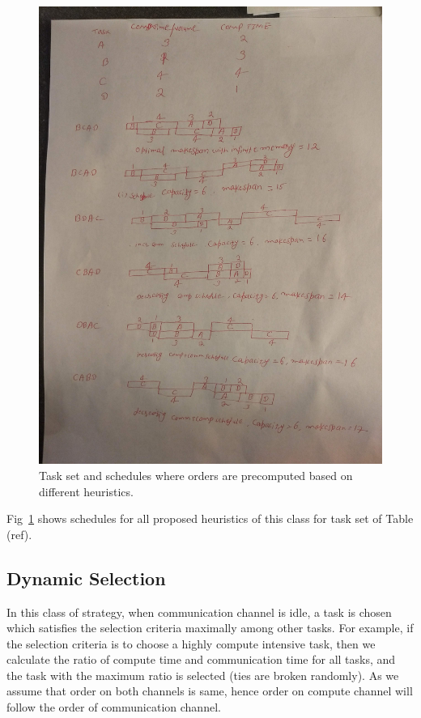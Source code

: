 \documentclass[runningheads]{llncs} %
\begin{document}
\begin{figure}[htb]
	
	\includegraphics[scale=0.05]{Figs/staticOrderSchedules}
			\caption{Task set and schedules where orders are precomputed based on different heuristics.}
	\label{fig:staticOrderExample}
\end{figure}

Fig~\ref{fig:staticOrderExample} shows schedules for all proposed heuristics of this class for task set of Table (ref).
\subsection{Dynamic Selection}

In this class of strategy, when communication channel is idle, a task is chosen which satisfies the selection criteria maximally among other tasks. For example, if the selection criteria is to choose a highly compute intensive task, then  we calculate the ratio of compute time and communication time for all tasks, and the task with the  maximum ratio is selected (ties are broken randomly). As we assume that order on both channels is same, hence order on compute channel will follow the order of communication channel.
\end{document}
